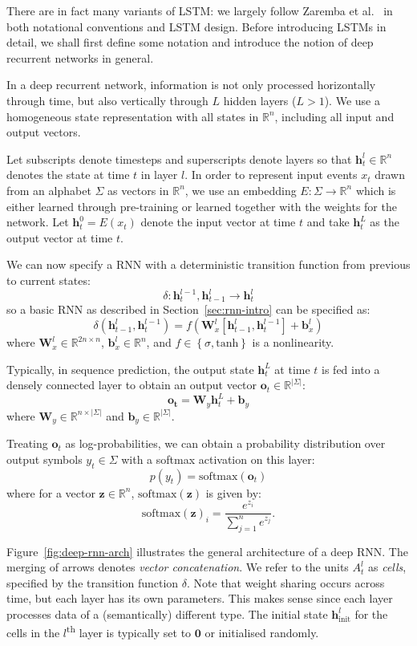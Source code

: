 \documentclass[12pt,a4paper,twoside,openright]{report}
\newcommand{\set}[1]{ \left\{ #1 \right\} }
\newcommand{\vect}[1]{\boldsymbol{\mathbf{#1}}}
\begin{document}
There are in fact many variants of LSTM: we largely follow Zaremba et al.\
\cite{zaremba2014recurrent} in both notational conventions and LSTM design.
Before introducing LSTMs in detail, we shall first define some notation and
introduce the notion of deep recurrent networks in general.

In a deep recurrent network, information is not only processed horizontally
through time, but also vertically through $L$ hidden layers ($L > 1$). We use a
homogeneous state representation with all states in $\mathbb{R}^n$, including
all input and output vectors. 

Let subscripts denote timesteps and superscripts denote layers so that
$\vect{h}_t^l \in \mathbb{R}^n$ denotes the state at time $t$ in layer $l$. In
order to represent input events $x_t$ drawn from an alphabet $\Sigma$ as vectors
in $\mathbb{R}^n$, we use an embedding $E : \Sigma \rightarrow \mathbb{R}^n$
which is either learned through pre-training or learned together with the
weights for the network. Let $\vect{h}_t^0 = E(x_t)$ denote the input vector at
time $t$ and take $\vect{h}_t^L$ as the output vector at time $t$.

We can now specify a RNN with a deterministic transition function from previous
to current states:
$$ \delta : \vect{h}_t^{l-1}, \vect{h}_{t-1}^l \rightarrow \vect{h}_t^l $$
so a basic RNN as described in Section~\ref{sec:rnn-intro} can be specified as:
$$ \delta(\vect{h}_{t-1}^l, \vect{h}_t^{l-1}) = f(\vect{W}^l_x [\vect{h}_{t-1}^l,
\vect{h}_t^{l-1}] + \vect{b}^l_x) $$
where $\vect{W}^l_x \in \mathbb{R}^{2n \times n}$, $\vect{b}^l_x \in
\mathbb{R}^n$, and $f \in \set{ \sigma, \mathrm{tanh} }$ is a nonlinearity.

Typically, in sequence prediction, the output state $\vect{h}_t^L$ at time $t$
is fed into a densely connected layer to obtain an output vector $\vect{o}_t \in
\mathbb{R}^{|\Sigma|}$:
$$ \vect{o_t} = \vect{W}_y \vect{h}_t^L + \vect{b}_y $$
where $\vect{W}_y \in \mathbb{R}^{n \times |\Sigma|}$ and $\vect{b}_y \in
\mathbb{R}^{|\Sigma|}$. 

Treating $\vect{o}_t$ as log-probabilities, we can obtain a probability
distribution over output symbols $y_t \in \Sigma$ with a softmax activation on
this layer:
$$ p(y_t) = \mathrm{softmax}(\vect{o}_t) $$
where for a vector $\vect{z} \in \mathbb{R}^n$, $\mathrm{softmax}(\vect{z})$ is
given by:
$$ \mathrm{softmax}(\vect{z})_i = \frac{ e^{z_i} }{ \sum_{j = 1}^n e^{z_j} }. $$

Figure~\ref{fig:deep-rnn-arch} illustrates the general architecture of a deep
RNN. The merging of arrows denotes \emph{vector concatenation}. We refer to the
units $A_t^l$ as \emph{cells}, specified by the transition function $\delta$.
Note that weight sharing occurs across time, but each layer has its own
parameters. This makes sense since each layer processes data of a (semantically)
different type. The initial state $\vect{h}_{\mathrm{init}}^l$ for the cells in
the $l$\textsuperscript{th} layer is typically set to $\vect{0}$ or initialised
randomly. 
\end{document}
